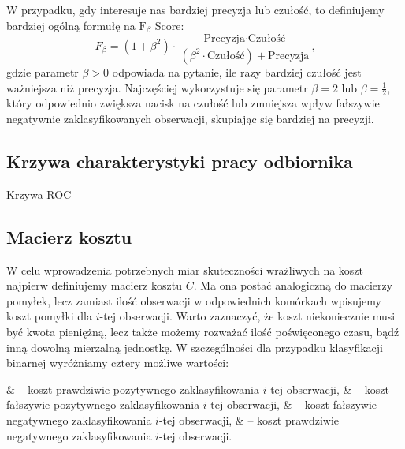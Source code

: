 \documentclass[inzynierska]{pwr_wmat_praca_dyplomowa}
\theoremstyle{plain}
\numberwithin{theorem}{chapter}
\theoremstyle{definition}
\numberwithin{theorem}{chapter}
\begin{document}
W przypadku, gdy interesuje nas bardziej precyzja lub czułość, to definiujemy bardziej ogólną formułę na $\text{F}_{\beta}$ Score:
$$ F_{\beta} = (1 + \beta^2) \cdot \frac{\text{Precyzja} \cdot \text{Czułość}}{(\beta^2 \cdot \text{Czułość}) + \text{Precyzja}} \text{,}$$
gdzie parametr $\beta>0$ odpowiada na pytanie, ile razy bardziej czułość jest ważniejsza niż precyzja. Najczęściej wykorzystuje się parametr $\beta = 2$ lub $\beta = \frac{1}{2}$, który odpowiednio zwiększa nacisk na czułość lub zmniejsza wpływ fałszywie negatywnie zaklasyfikowanych obserwacji, skupiając się bardziej na precyzji.


\subsection{Krzywa charakterystyki pracy odbiornika}
\label{ROC}

Krzywa ROC

\subsection{Macierz kosztu}
\label{sec:macierz-kosztu}
W celu wprowadzenia potrzebnych miar skuteczności wrażliwych na koszt najpierw definiujemy macierz kosztu $C$. Ma ona postać analogiczną do macierzy pomyłek, lecz zamiast ilość obserwacji w odpowiednich komórkach wpisujemy koszt pomyłki dla $i$-tej obserwacji. Warto zaznaczyć, że koszt niekoniecznie musi być kwota pieniężną, lecz także możemy rozważać ilość poświęconego czasu, bądź inną dowolną mierzalną jednostkę. W szczególności dla przypadku klasyfikacji binarnej wyróżniamy cztery możliwe wartości:
\begin{myitemize}
	&  -- koszt prawdziwie pozytywnego zaklasyfikowania $i$-tej obserwacji,
	&  -- koszt fałszywie pozytywnego zaklasyfikowania $i$-tej obserwacji,
	&  -- koszt fałszywie negatywnego zaklasyfikowania $i$-tej obserwacji,
	&  -- koszt prawdziwie negatywnego zaklasyfikowania $i$-tej obserwacji.
\end{myitemize}
\end{document}
